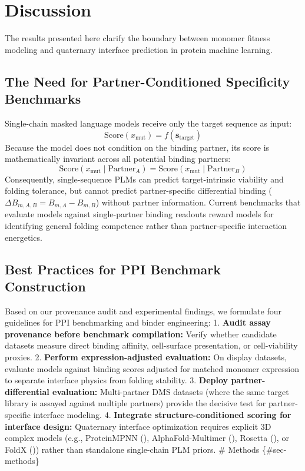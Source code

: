 \documentclass[
  11pt,
  us-letterpaper,
  DIV=11,
  numbers=noendperiod]{scrartcl}
\begin{document}
\section{Discussion}\label{sec-discussion}

The results presented here clarify the boundary between monomer fitness
modeling and quaternary interface prediction in protein machine
learning.

\subsection{The Need for Partner-Conditioned Specificity
Benchmarks}\label{the-need-for-partner-conditioned-specificity-benchmarks}

Single-chain masked language models receive only the target sequence as
input: \[\text{Score}(x_{\text{mut}}) = f(\mathbf{s}_{\text{target}})\]
Because the model does not condition on the binding partner, its score
is mathematically invariant across all potential binding partners:
\[\text{Score}(x_{\text{mut}} \mid \text{Partner}_A) = \text{Score}(x_{\text{mut}} \mid \text{Partner}_B)\]
Consequently, single-sequence PLMs can predict target-intrinsic
viability and folding tolerance, but cannot predict partner-specific
differential binding (\(\Delta B_{m, A, B} = B_{m, A} - B_{m, B}\))
without partner information. Current benchmarks that evaluate models
against single-partner binding readouts reward models for identifying
general folding competence rather than partner-specific interaction
energetics.

\subsection{Best Practices for PPI Benchmark
Construction}\label{best-practices-for-ppi-benchmark-construction}

Based on our provenance audit and experimental findings, we formulate
four guidelines for PPI benchmarking and binder engineering: 1.
\textbf{Audit assay provenance before benchmark compilation:} Verify
whether candidate datasets measure direct binding affinity, cell-surface
presentation, or cell-viability proxies. 2. \textbf{Perform
expression-adjusted evaluation:} On display datasets, evaluate models
against binding scores adjusted for matched monomer expression to
separate interface physics from folding stability. 3. \textbf{Deploy
partner-differential evaluation:} Multi-partner DMS datasets (where the
same target library is assayed against multiple partners) provide the
decisive test for partner-specific interface modeling. 4.
\textbf{Integrate structure-conditioned scoring for interface design:}
Quaternary interface optimization requires explicit 3D complex models
(e.g., ProteinMPNN (), AlphaFold-Multimer (), Rosetta (),
or FoldX ())
rather than standalone single-chain PLM priors. \# Methods
\{\#sec-methods\}
\end{document}
